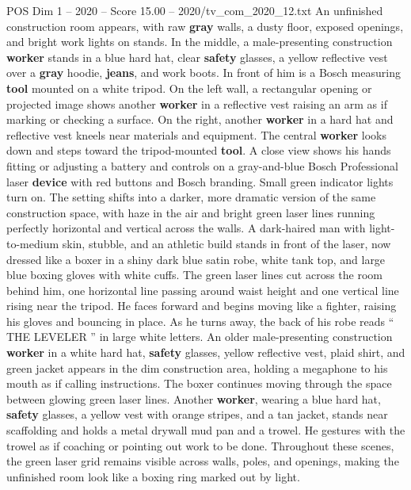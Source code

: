 \begin{textsample}{POS Dim 1 – 2020 – Score 15.00 – 2020/tv\_com\_2020\_12.txt}  \label{ex:f1_pos_016}
An unfinished construction room appears, with raw \textbf{gray} walls, a dusty floor, exposed openings, and bright work lights on stands.
In the middle, a male-presenting construction \textbf{worker} stands in a blue hard hat, clear \textbf{safety} glasses, a yellow reflective vest over a \textbf{gray} hoodie, \textbf{jeans}, and work boots.
In front of him is a Bosch measuring \textbf{tool} mounted on a white tripod.
On the left wall, a rectangular opening or projected image shows another \textbf{worker} in a reflective vest raising an arm as if marking or checking a surface.
On the right, another \textbf{worker} in a hard hat and reflective vest kneels near materials and equipment.
The central \textbf{worker} looks down and steps toward the tripod-mounted \textbf{tool}.
A close view shows his hands fitting or adjusting a battery and controls on a gray-and-blue Bosch Professional laser \textbf{device} with red buttons and Bosch branding.
Small green indicator lights turn on.
The setting shifts into a darker, more dramatic version of the same construction space, with haze in the air and bright green laser lines running perfectly horizontal and vertical across the walls.
A dark-haired man with light-to-medium skin, stubble, and an athletic build stands in front of the laser, now dressed like a boxer in a shiny dark blue satin robe, white tank top, and large blue boxing gloves with white cuffs.
The green laser lines cut across the room behind him, one horizontal line passing around waist height and one vertical line rising near the tripod.
He faces forward and begins moving like a fighter, raising his gloves and bouncing in place.
As he turns away, the back of his robe reads “ THE LEVELER ” in large white letters.
An older male-presenting construction \textbf{worker} in a white hard hat, \textbf{safety} glasses, yellow reflective vest, plaid shirt, and green jacket appears in the dim construction area, holding a megaphone to his mouth as if calling instructions.
The boxer continues moving through the space between glowing green laser lines.
Another \textbf{worker}, wearing a blue hard hat, \textbf{safety} glasses, a yellow vest with orange stripes, and a tan jacket, stands near scaffolding and holds a metal drywall mud pan and a trowel.
He gestures with the trowel as if coaching or pointing out work to be done.
Throughout these scenes, the green laser grid remains visible across walls, poles, and openings, making the unfinished room look like a boxing ring marked out by light.

\end{textsample}
